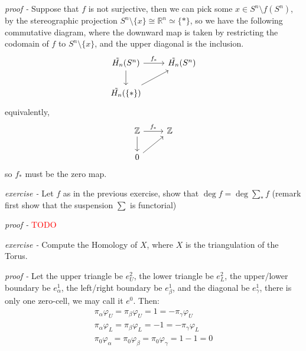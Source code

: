 \documentclass[11pt]{article}
\theoremstyle{definition}
\newcommand{\set}[1]{\{#1\}}
\begin{document}
    \emph{proof - } Suppose that \(f\) is not surjective, then we can pick some \(x \in S^n \setminus f(S^n)\), by the stereographic projection \(S^n \setminus \set{x} \cong \mathbb{R}^n \simeq \set{*}\), so we have the following commutative diagram, where the downward map is taken by restricting the codomain of \(f\) to \(S^n \setminus \set{x}\), and the upper diagonal is the inclusion.
    \begin{equation*}
        \begin{tikzcd}
            \tilde{H_n}(S^n) \arrow[r,"{f_*}"] \arrow[d] &\tilde{H_n}(S^n) \\
            \tilde{H_n}(\set{*}) \arrow[ur]
        \end{tikzcd}
    \end{equation*}
    equivalently,
    \begin{equation*}
        \begin{tikzcd}
            \mathbb{Z} \arrow[r,"{f_*}"] \arrow[d] &\mathbb{Z} \\
            0 \arrow[ur]
        \end{tikzcd}
    \end{equation*}
    so \(f_*\) must be the zero map.


    \emph{exercise - }\label{HEx12} Let \(f\) as in the previous exercise, show that \(\deg f = \deg \sum_* f \) (remark first  show that the suspension \(\sum\) is functorial)

    \emph{proof - }\textcolor{red}{TODO}



    \emph{exercise - }\label{HEx13} Compute the Homology of \(X\), where \(X\) is the triangulation of the Torus.

    \emph{proof - } Let the upper triangle be \(e_U^2\), the lower triangle be \(e_L^2\), the upper/lower boundary be \(e_\alpha^1\), the left/right boundary be \(e_\beta^1\), and the diagonal be \(e_\gamma^1\), there is only one zero-cell, we may call it \(e^0\). Then:
    \begin{align*}
        \pi_\alpha \varphi_U = \pi_\beta \varphi_U = 1 = - \pi_\gamma \varphi_U \\
        \pi_\alpha \varphi_L = \pi_\beta \varphi_L = -1 = - \pi_\gamma \varphi_L \\
        \pi_0 \varphi_\alpha = \pi_0 \varphi_\beta = \pi_0 \varphi_\gamma = 1 - 1 = 0
    \end{align*}
\end{document}
